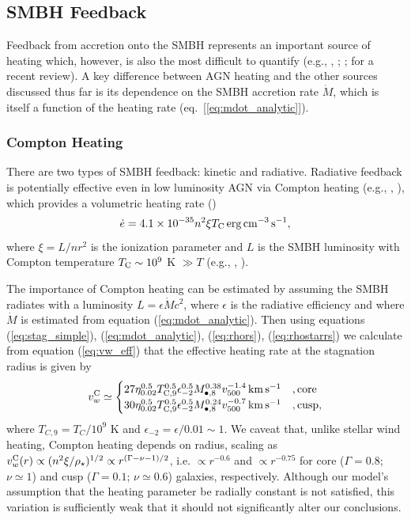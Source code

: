 \documentclass[usenatbib,fleqn]{mn2e}
\newcommand{\densSlope}{\nu}
\begin{document}
\subsection{SMBH Feedback}

Feedback from accretion onto the SMBH represents an important source of heating which, however, is also the most difficult to quantify (e.g., \citealt{Brighenti&Mathews03}, \citealt{DiMatteo+05}; \citealt{Kurosawa&Proga09}; \citealt{Fabian12} for a recent review).  A key difference between AGN heating and the other sources discussed thus far is its dependence on the SMBH accretion rate $\dot{M}$, which is itself a function of the heating rate (eq.~[\ref{eq:mdot_analytic}]).  

\subsubsection{Compton Heating}

There are two types of SMBH feedback: kinetic and radiative.
Radiative feedback is potentially effective even in low luminosity AGN
via Compton heating (e.g., \citealt{Sazonov+04}, \citealt{Ciotti+10}),
which provides a volumetric heating rate (\citealt{Gan+14})
\begin{align}
\dot{e} = 4.1\times 10^{-35}n^{2}\xi T_{\rm C}\,{\rm erg\,cm^{-3}\,s^{-1}},
\end{align}
where $\xi = L/n r^{2}$ is the ionization parameter and $L$ is the SMBH luminosity with Compton temperature $T_{\rm C} \sim 10^{9}$ K $\gg T$ (e.g., \citealt{Ho99}, \citealt{Eracleous+10}).  

The importance of Compton heating can be estimated by assuming the SMBH
radiates with a luminosity $L = \epsilon \dot{M}c^{2}$, where
$\epsilon$ is the radiative efficiency and where $\dot{M}$ is
estimated from equation (\ref{eq:mdot_analytic}).  Then using
equations (\ref{eq:stag_simple}), (\ref{eq:mdot_analytic}),
(\ref{eq:rhors}), (\ref{eq:rhostarrs}) we calculate from equation
(\ref{eq:vw_eff}) that the effective heating rate at the stagnation radius is given by
\begin{align} v_{w}^{\rm C} \simeq
  \begin{cases} 27 \eta_{0.02}^{0.5}T_{\rm
C,9}^{0.5}\epsilon_{-2}^{0.5} M_{\bullet,8}^{0.38}v_{500}^{-1.4}\,{\rm
km\,s^{-1}} &, \text{core}\\ 30 \eta_{0.02}^{0.5}T_{\rm
C,9}^{0.5}\epsilon_{-2}^{0.5} M_{\bullet,8}^{0.24}v_{500}^{-0.7}\,{\rm
km\,s^{-1}} &, \text{cusp},
  \end{cases}
  \label{eq:vC}
\end{align} where $T_{C,9} = T_{C}/10^{9}$ K and $\epsilon_{-2} =
\epsilon/0.01 \sim 1$.  We caveat that, unlike stellar wind heating,
Compton heating depends on radius, scaling as $v_{w}^{\rm C}(r)
\propto (n^{2}\xi/\rho_{\star})^{1/2} \propto
r^{(\Gamma-\densSlope-1)/2}$, i.e. $\propto r^{-0.6}$ and $\propto
r^{-0.75}$ for core ($\Gamma = 0.8$; $\densSlope \simeq 1$) and cusp
($\Gamma = 0.1$; $\densSlope \simeq 0.6$) galaxies, respectively.  Although our
model's assumption that the heating parameter be radially constant is
not satisfied, this variation is sufficiently weak that it should
not significantly alter our conclusions.
\end{document}
